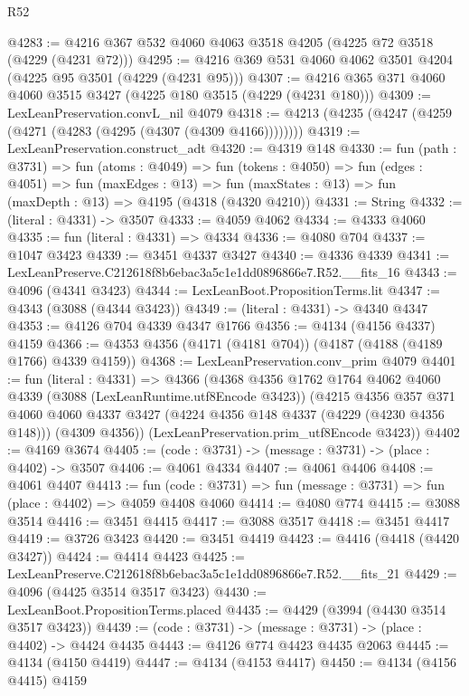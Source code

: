 \begin{lexlean}{R52}
\begin{coremodule}
@4283 := @4216 @367 @532 @4060 @4063 @3518 @4205 (@4225 @72 @3518 (@4229 (@4231 @72)))
@4295 := @4216 @369 @531 @4060 @4062 @3501 @4204 (@4225 @95 @3501 (@4229 (@4231 @95)))
@4307 := @4216 @365 @371 @4060 @4060 @3515 @3427 (@4225 @180 @3515 (@4229 (@4231 @180)))
@4309 := LexLeanPreservation.convL_nil @4079
@4318 := @4213 (@4235 (@4247 (@4259 (@4271 (@4283 (@4295 (@4307 (@4309 @4166))))))))
@4319 := LexLeanPreservation.construct_adt
@4320 := @4319 @148
@4330 := fun (path : @3731) =>
  fun (atoms : @4049) =>
  fun (tokens : @4050) =>
  fun (edges : @4051) =>
  fun (maxEdges : @13) =>
  fun (maxStates : @13) => fun (maxDepth : @13) => @4195 (@4318 (@4320 @4210))
@4331 := String
@4332 := (literal : @4331) -> @3507
@4333 := @4059 @4062
@4334 := @4333 @4060
@4335 := fun (literal : @4331) => @4334
@4336 := @4080 @704
@4337 := @1047 @3423
@4339 := @3451 @4337 @3427
@4340 := @4336 @4339
@4341 := LexLeanPreserve.C212618f8b6ebac3a5c1e1dd0896866e7.R52.__fits_16
@4343 := @4096 (@4341 @3423)
@4344 := LexLeanBoot.PropositionTerms.lit
@4347 := @4343 (@3088 (@4344 @3423))
@4349 := (literal : @4331) -> @4340 @4347
@4353 := @4126 @704 @4339 @4347 @1766
@4356 := @4134 (@4156 @4337) @4159
@4366 := @4353 @4356 (@4171 (@4181 @704)) (@4187 (@4188 (@4189 @1766) @4339 @4159))
@4368 := LexLeanPreservation.conv_prim @4079
@4401 := fun (literal : @4331) =>
  @4366
    (@4368
      @4356
      @1762
      @1764
      @4062
      @4060
      @4339
      (@3088 (LexLeanRuntime.utf8Encode @3423))
      (@4215
        @4356
        @357
        @371
        @4060
        @4060
        @4337
        @3427
        (@4224 @4356 @148 @4337 (@4229 (@4230 @4356 @148)))
        (@4309 @4356))
      (LexLeanPreservation.prim_utf8Encode @3423))
@4402 := @4169 @3674
@4405 := (code : @3731) -> (message : @3731) -> (place : @4402) -> @3507
@4406 := @4061 @4334
@4407 := @4061 @4406
@4408 := @4061 @4407
@4413 := fun (code : @3731) => fun (message : @3731) => fun (place : @4402) => @4059 @4408 @4060
@4414 := @4080 @774
@4415 := @3088 @3514
@4416 := @3451 @4415
@4417 := @3088 @3517
@4418 := @3451 @4417
@4419 := @3726 @3423
@4420 := @3451 @4419
@4423 := @4416 (@4418 (@4420 @3427))
@4424 := @4414 @4423
@4425 := LexLeanPreserve.C212618f8b6ebac3a5c1e1dd0896866e7.R52.__fits_21
@4429 := @4096 (@4425 @3514 @3517 @3423)
@4430 := LexLeanBoot.PropositionTerms.placed
@4435 := @4429 (@3994 (@4430 @3514 @3517 @3423))
@4439 := (code : @3731) -> (message : @3731) -> (place : @4402) -> @4424 @4435
@4443 := @4126 @774 @4423 @4435 @2063
@4445 := @4134 (@4150 @4419)
@4447 := @4134 (@4153 @4417)
@4450 := @4134 (@4156 @4415) @4159

\end{coremodule}
\end{lexlean}
